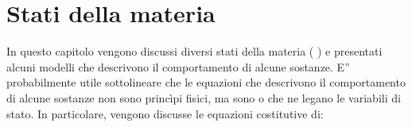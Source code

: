 \documentclass[letterpaper,10pt,italian]{jupyterBook}
\begin{document}
\chapter{Stati della materia}
\label{\detokenize{ch/thermodynamics/matter:stati-della-materia}}\label{\detokenize{ch/thermodynamics/matter:physics-hs-thermodynamics-matter}}\label{\detokenize{ch/thermodynamics/matter::doc}}
\sphinxAtStartPar
In questo capitolo vengono discussi diversi stati della materia ( ) e presentati alcuni modelli che descrivono il comportamento di alcune sostanze.
E” probabilmente utile sottolineare che le equazioni che descrivono il comportamento di alcune sostanze non sono princìpi fisici, ma sono  o  che ne legano le variabili di stato. In particolare, vengono discusse le equazioni costitutive di:
\end{document}

